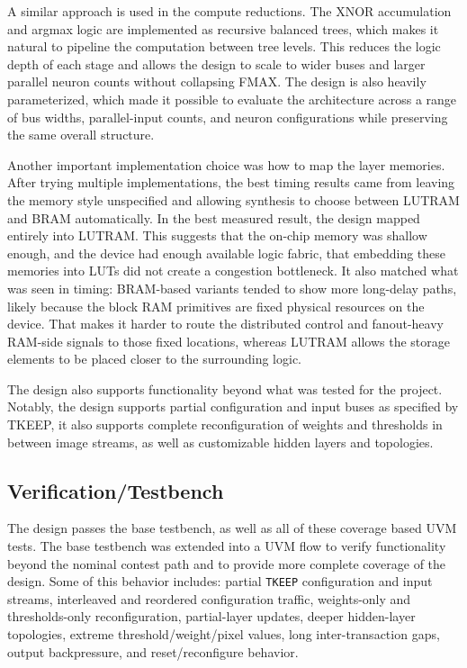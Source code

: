 A similar approach is used in the compute reductions. The XNOR accumulation and
argmax logic are implemented as recursive balanced trees, which makes it
natural to pipeline the computation between tree levels. This reduces the logic
depth of each stage and allows the design to scale to wider buses and larger
parallel neuron counts without collapsing FMAX. The design is also heavily
parameterized, which made it possible to evaluate the architecture across a
range of bus widths, parallel-input counts, and neuron configurations while
preserving the same overall structure.

Another important implementation choice was how to map the layer memories.
After trying multiple implementations, the best timing results came from
leaving the memory style unspecified and allowing synthesis to choose between
LUTRAM and BRAM automatically. In the best measured result, the design mapped
entirely into LUTRAM. This suggests that the on-chip memory was shallow enough,
and the device had enough available logic fabric, that embedding these memories
into LUTs did not create a congestion bottleneck. It also matched what was seen
in timing: BRAM-based variants tended to show more long-delay paths, likely
because the block RAM primitives are fixed physical resources on the device.
That makes it harder to route the distributed control and fanout-heavy RAM-side
signals to those fixed locations, whereas LUTRAM allows the storage elements to
be placed closer to the surrounding logic.

The design also supports functionality beyond what was tested for the project.
Notably, the design supports partial configuration and input buses as specified
by TKEEP, it also supports complete reconfiguration of weights and thresholds in
between image streams, as well as customizable hidden layers and topologies.

\subsection{Verification/Testbench}

The design passes the base testbench, as well as all of these coverage based UVM tests.
The base testbench was extended into a UVM flow to verify functionality beyond
the nominal contest path and to provide more complete coverage of the design.
Some of this behavior includes: partial \texttt{TKEEP} configuration and input streams,
interleaved and reordered configuration traffic, weights-only and
thresholds-only reconfiguration, partial-layer updates, deeper hidden-layer
topologies, extreme threshold/weight/pixel values, long inter-transaction
gaps, output backpressure, and reset/reconfigure behavior.

